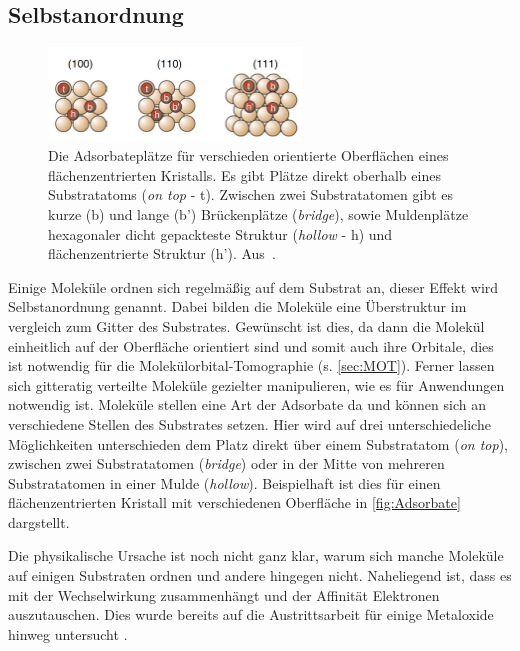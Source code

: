         \subsection{Selbstanordnung}
            \begin{figure}
                \centering
                \includegraphics[width=0.6\textwidth]{./content/Adsorbate}
                \caption{Die Adsorbateplätze für verschieden orientierte Oberflächen eines flächenzentrierten Kristalls.
                Es gibt Plätze direkt oberhalb eines Substratatoms (\textit{on top} - t).
                Zwischen zwei Substratatomen gibt es kurze (b) und lange (b') Brückenplätze (\textit{bridge}), sowie Muldenplätze hexagonaler dicht gepackteste Struktur (\textit{hollow} - h) und flächenzentrierte Struktur (h'). Aus~\cite{Fauster}.}
                \label{fig:Adsorbate}
            \end{figure}
            Einige Moleküle ordnen sich regelmäßig auf dem Substrat an, dieser Effekt wird Selbstanordnung genannt.
            Dabei bilden die Moleküle eine Überstruktur im vergleich zum Gitter des Substrates.
            Gewünscht ist dies, da dann die Molekül einheitlich auf der Oberfläche orientiert sind und somit auch ihre Orbitale, dies ist notwendig für die Molekülorbital-Tomographie (s. \autoref{sec:MOT}).
            Ferner lassen sich gitteratig verteilte Moleküle gezielter manipulieren, wie es für Anwendungen notwendig ist.
            Moleküle stellen eine Art der Adsorbate da und können sich an verschiedene Stellen des Substrates setzen.
            Hier wird auf drei unterschiedeliche Möglichkeiten unterschieden dem Platz direkt über einem Substratatom (\textit{on top}), zwischen zwei Substratatomen (\textit{bridge}) oder in der Mitte von mehreren Substratatomen in einer Mulde (\textit{hollow}).
            Beispielhaft ist dies für einen flächenzentrierten Kristall mit verschiedenen Oberfläche in \autoref{fig:Adsorbate} dargstellt.

            Die physikalische Ursache ist noch nicht ganz klar, warum sich manche Moleküle auf einigen Substraten ordnen und andere hingegen nicht.
            Naheliegend ist, dass es mit der Wechselwirkung zusammenhängt und der Affinität Elektronen auszutauschen.
            Dies wurde bereits auf die Austrittsarbeit für einige Metaloxide hinweg untersucht \cite{greiner_universal_2012}.

